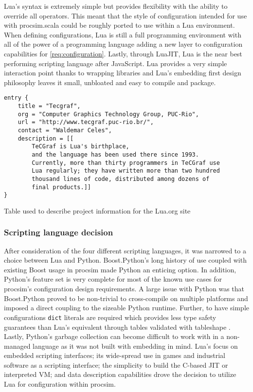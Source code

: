 Lua's syntax is extremely simple but provides flexibility with the ability to override all operators. This meant that the style of configuration intended for use with procsim.scala could be roughly ported to use within a Lua environment. When defining configurations, Lua is still a full programming environment with all of the power of a programming language adding a new layer to configuration capabilities for \cref{req:configuration}. Lastly, through LuaJIT, Lua is the near best performing scripting language after JavaScript. Lua provides a very simple interaction point thanks to wrapping libraries and Lua's embedding first design philosophy leaves it small, unbloated and easy to compile and package. 

\begin{listing}[t!]
\begin{verbatim}
entry {
    title = "Tecgraf",
    org = "Computer Graphics Technology Group, PUC-Rio",
    url = "http://www.tecgraf.puc-rio.br/",
    contact = "Waldemar Celes",
    description = [[
        TeCGraf is Lua's birthplace,
        and the language has been used there since 1993.
        Currently, more than thirty programmers in TeCGraf use
        Lua regularly; they have written more than two hundred
        thousand lines of code, distributed among dozens of
        final products.]]
}
\end{verbatim}
\caption{Table used to describe project information for the Lua.org site \cite{Ierusalimschy:PIL}}
\label{lst:lua:project-example}
\end{listing}

\subsubsection{Scripting language decision}

After consideration of the four different scripting languages, it was narrowed to a choice between Lua and Python. Boost.Python's long history of use coupled with existing Boost usage in procsim made Python an enticing option. In addition, Python's feature set is very complete for most of the known use cases for procsim's configuration design requirements. A large issue with Python was that Boost.Python proved to be non-trivial to cross-compile on multiple platforms and imposed a direct coupling to the sizeable Python runtime. Further, to have simple configurations \texttt{dict} literals are required which provides less type safety guarantees than Lua's equivalent through tables validated with tableshape \cite{Python:BuiltinTypes, Ierusalimschy:PIL, GitHub:leafto:tableshape}. Lastly, Python's garbage collection can become difficult to work with in a non-managed language as it was not built with embedding in mind. Lua's focus on embedded scripting interfaces; its wide-spread use in games and industrial software as a scripting interface; the simplicity to build the C-based JIT or interpreted VM; and data description capabilities drove the decision to utilize Lua for configuration within procsim. 


